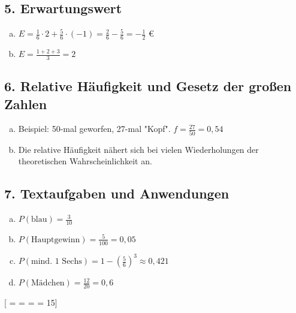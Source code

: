 \subsection*{5. Erwartungswert}
\begin{enumerate}[a)]
    \item $E = \frac{1}{6} \cdot 2 + \frac{5}{6} \cdot (-1) = \frac{2}{6} - \frac{5}{6} = -\frac{1}{2}$ €
    \item $E = \frac{1+2+3}{3} = 2$
\end{enumerate}

\subsection*{6. Relative Häufigkeit und Gesetz der großen Zahlen}
\begin{enumerate}[a)]
    \item Beispiel: 50-mal geworfen, 27-mal "Kopf". $f = \frac{27}{50} = 0{,}54$
    \item Die relative Häufigkeit nähert sich bei vielen Wiederholungen der theoretischen Wahrscheinlichkeit an.
\end{enumerate}

\subsection*{7. Textaufgaben und Anwendungen}
\begin{enumerate}[a)]
    \item $P(\text{blau}) = \frac{3}{10}$
    \item $P(\text{Hauptgewinn}) = \frac{5}{100} = 0{,}05$
    \item $P(\text{mind. 1 Sechs}) = 1 - (\frac{5}{6})^3 \approx 0{,}421$
    \item $P(\text{Mädchen}) = \frac{12}{20} = 0{,}6$
\end{enumerate}

[  =  =  =  = 15]
